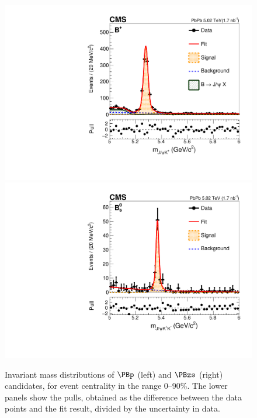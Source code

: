 \begin{figure}[t]
\centering
\includegraphics[width=.49\textwidth]{mass_bu.pdf}
\includegraphics[width=.49\textwidth]{mass_bs.pdf}
\caption{Invariant mass distributions of $\PBp$ (left) and $\PBzs$ (right) candidates, 
for event centrality in the range 0--90\%. The lower panels show the pulls, obtained as the difference between the data points and the fit result, divided by the uncertainty in data.}
\label{fig:massPeaks}
\end{figure}

